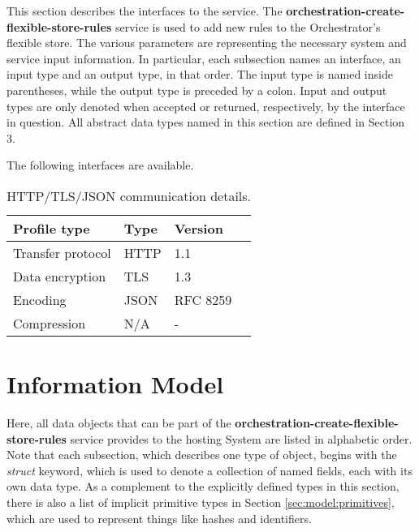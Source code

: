 \documentclass[a4paper]{arrowhead}
\begin{document}
This section describes the interfaces to the service. The \textbf{orchestration-create-flexible-store-rules} service is used to add new rules to the Orchestrator's flexible store. The various parameters are representing the necessary system and service input information.
In particular, each subsection names an interface, an input type and an output type, in that order.
The input type is named inside parentheses, while the output type is preceded by a colon.
Input and output types are only denoted when accepted or returned, respectively, by the interface in question. All abstract data types named in this section are defined in Section 3.

The following interfaces are available.


\begin{table}[ht!]
  \centering
  \begin{tabular}{|l|l|l|l|}
    \rowcolor{gray!33} Profile type & Type & Version \\ \hline
    Transfer protocol & HTTP & 1.1 \\ \hline
    Data encryption & TLS & 1.3 \\ \hline
    Encoding & JSON & RFC 8259 \cite{rfc8259} \\ \hline
    Compression & N/A & - \\ \hline
  \end{tabular}
  \caption{HTTP/TLS/JSON communication details.}
  \label{tab:comunication_semantics_profile}
\end{table}

\clearpage

\section{Information Model}
\label{sec:model}

Here, all data objects that can be part of the \textbf{orchestration-create-flexible-store-rules} service provides to the hosting System are listed in alphabetic order.
Note that each subsection, which describes one type of object, begins with the \textit{struct} keyword, which is used to denote a collection of named fields, each with its own data type.
As a complement to the explicitly defined types in this section, there is also a list of implicit primitive types in Section \ref{sec:model:primitives}, which are used to represent things like hashes and identifiers.
\end{document}
